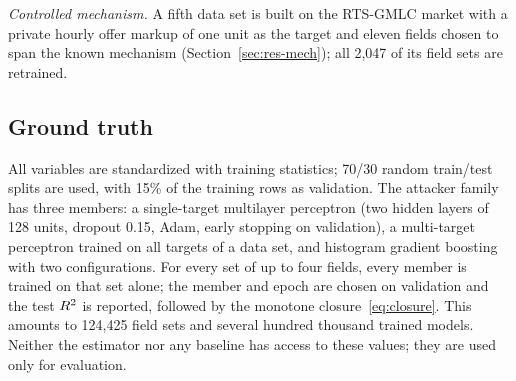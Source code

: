\emph{Controlled mechanism.} A fifth data set is built on the RTS-GMLC market with a private hourly
offer markup of one unit as the target and eleven fields chosen to span the known mechanism
(Section~\ref{sec:res-mech}); all 2,047 of its field sets are retrained.

\begin{table}[!tbp]
\centering\small
\caption{Data sets. $n$: train/test rows; $p$: candidate fields; sets: field sets with exact
three-attacker ground truth.}\label{tab:data}
\end{table}

\subsection{Ground truth}
All variables are standardized with training statistics; 70/30 random train/test splits are
used, with 15\% of the training rows as validation. The attacker family has three members: a
single-target multilayer perceptron (two hidden layers of 128 units, dropout 0.15, Adam,
early stopping on validation), a multi-target perceptron trained on all targets of a data set,
and histogram gradient boosting with two configurations. For every set of up to four fields,
every member is trained on that set alone; the member and epoch are chosen on validation and the
test $R^{2}$ is reported, followed by the monotone closure~\eqref{eq:closure}. This amounts to
124,425 field sets and several hundred thousand trained models. Neither the
estimator nor any baseline has access to these values; they are used only for evaluation.

